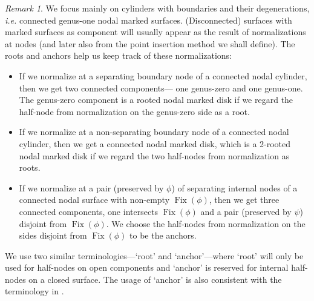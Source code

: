 \documentclass[11pt]{amsart}
\theoremstyle{definition}
\theoremstyle{remark}
\newtheorem{rmk}[dummy]{Remark}
\newcommand{\<}{\left<}
\renewcommand{\>}{\right>}
\numberwithin{equation}{section}
\begin{document}
\begin{rmk}\label{rmk root when degenerate}
We focus mainly on cylinders with boundaries and their degenerations, \textit{i.e.} connected genus-one nodal marked surfaces. (Disconnected) surfaces with marked surfaces as component will usually appear as the result of normalizations at nodes (and later also from the point insertion method we shall define). The roots and anchors help us keep track of these %
normalizations:
\begin{itemize}
    \item[-]  If %
we normalize at a separating boundary node of a connected nodal cylinder, then we get two %
connected components--- one %
genus-zero and one genus-one. The genus-zero component is a rooted nodal marked disk if we regard the half-node from normalization on the genus-zero side as a root.
    \item[-] If we normalize at a non-separating boundary node of a connected nodal cylinder, then we get a connected nodal marked disk, which is a 2-rooted nodal marked disk if we regard the two half-nodes from normalization as roots.
    \item[-]  If we normalize at a pair (preserved by $\phi$) of separating internal nodes of a connected nodal surface with non-empty $\operatorname{Fix}(\phi)$, then we get three connected components, one intersects $\operatorname{Fix}(\phi)$ and a pair (preserved by $\psi$) disjoint from $\operatorname{Fix}(\phi)$. We choose the half-nodes from normalization on the sides disjoint from $\operatorname{Fix}(\phi)$ to be the anchors.
\end{itemize}
We use two %
similar terminologies---`root' and `anchor'---where `root' %
will only be used for half-nodes on open components and `anchor' is reserved for internal half-nodes on a closed surface. The usage of `anchor' is also consistent with the terminology in \cite{BCT1,BCT2,TZ1,TZ2}.

\end{rmk}
\end{document}
